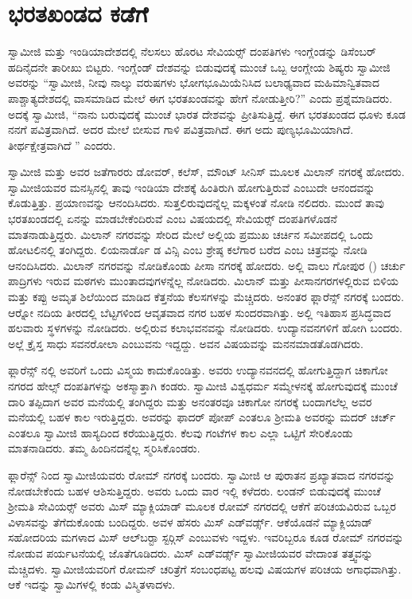 
\chapter{ಭರತಖಂಡದ ಕಡೆಗೆ }

 ಸ್ವಾಮೀಜಿ ಮತ್ತು ಇಂಡಿಯಾದೇಶದಲ್ಲಿ ನೆಲಸಲು ಹೊರಟ ಸೇವಿಯರ್ಸ್‍‍ ದಂಪತಿಗಳು ಇಂಗ್ಲೆಂಡನ್ನು ಡಿಸೆಂಬರ್ ಹದಿನೈದನೇ ತಾರೀಖು ಬಿಟ್ಟರು. ಇಂಗ್ಲೆಂಡ್ ದೇಶವನ್ನು ಬಿಡುವುದಕ್ಕೆ ಮುಂಚೆ ಒಬ್ಬ ಆಂಗ್ಲೇಯ ಶಿಷ್ಯರು ಸ್ವಾಮೀಜಿ ಅವರನ್ನು “ಸ್ವಾಮೀಜಿ, ನೀವು ನಾಲ್ಕು ವರುಷಗಳು ಭೋಗಭೂಮಿಯೆನಿಸಿದ ಬಲಾಢ್ಯವಾದ ಮಹಿಮಾನ್ವಿತವಾದ ಪಾಶ್ಚಾತ್ಯದೇಶದಲ್ಲಿ ವಾಸಮಾಡಿದ ಮೇಲೆ ಈಗ ಭರತಖಂಡವನ್ನು ಹೇಗೆ ನೋಡುತ್ತೀರಿ?” ಎಂದು ಪ್ರಶ್ನೆಮಾಡಿದರು. ಅದಕ್ಕೆ ಸ್ವಾಮೀಜಿ, “ನಾನು ಬರುವುದಕ್ಕೆ ಮುಂಚೆ ಭಾರತ ದೇಶವನ್ನು ಪ್ರೀತಿಸುತ್ತಿದ್ದೆ. ಈಗ ಭರತಖಂಡದ ಧೂಳು ಕೂಡ ನನಗೆ ಪವಿತ್ರವಾಗಿದೆ. ಅದರ ಮೇಲೆ ಬೀಸುವ ಗಾಳಿ ಪವಿತ್ರವಾಗಿದೆ. ಈಗ ಅದು ಪುಣ್ಯಭೂಮಿಯಾಗಿದೆ. ತೀರ್ಥಕ್ಷೇತ್ರವಾಗಿದೆ ” ಎಂದರು. 

 ಸ್ವಾಮೀಜಿ ಮತ್ತು ಅವರ ಜತೆಗಾರರು ಡೋವರ್, ಕಲೆಸ್, ಮೌಂಟ್ ಸೀನಿಸ್ ಮೂಲಕ ಮಿಲಾನ್ ನಗರಕ್ಕೆ ಹೋದರು. ಸ್ವಾಮೀಜಿಯವರ ಮನಸ್ಸಿನಲ್ಲಿ ತಾವು ಇಂಡಿಯಾ ದೇಶಕ್ಕೆ ಹಿಂತಿರುಗಿ ಹೋಗುತ್ತಿರುವೆ ಎಂಬುದೇ ಆನಂದವನ್ನು ಕೊಡುತ್ತಿತ್ತು. ಪ್ರಯಾಣವನ್ನು ಆನಂದಿಸಿದರು. ಸುತ್ತಲಿರುವುದನ್ನೆಲ್ಲ ಮಕ್ಕಳಂತೆ ನೋಡಿ ನಲಿದರು. ಮುಂದೆ ತಾವು ಭರತಖಂಡದಲ್ಲಿ ಏನನ್ನು ಮಾಡಬೇಕೆಂದಿರುವೆ ಎಂಬ ವಿಷಯದಲ್ಲಿ ಸೇವಿಯರ್ಸ್‍‍ ದಂಪತಿಗಳೊಡನೆ ಮಾತನಾಡುತ್ತಿದ್ದರು. ಮಿಲಾನ್ ನಗರವನ್ನು ಸೇರಿದ ಮೇಲೆ ಅಲ್ಲಿಯ ಪ್ರಮುಖ ಚರ್ಚಿನ ಸಮೀಪದಲ್ಲಿ ಒಂದು ಹೋಟಲಿನಲ್ಲಿ ತಂಗಿದ್ದರು. ಲಿಯನಾರ್ಡೊ ಡ ವಿನ್ಸಿ ಎಂಬ ಶ್ರೇಷ್ಠ ಕಲೆಗಾರ ಬರೆದ  ಎಂಬ ಚಿತ್ರವನ್ನು ನೋಡಿ ಆನಂದಿಸಿದರು. ಮಿಲಾನ್ ನಗರವನ್ನು ನೋಡಿಕೊಂಡು ಪೀಸಾ ನಗರಕ್ಕೆ ಹೋದರು. ಅಲ್ಲಿ ವಾಲು ಗೋಪುರ () ಚರ್ಚು ಪಾದ್ರಿಗಳು ಇರುವ ಮಠಗಳು ಮುಂತಾದವುಗಳನ್ನೆಲ್ಲ ನೋಡಿದರು. ಮಿಲಾನ್ ಮತ್ತು ಪೀಸಾನಗರಗಳಲ್ಲಿರುವ ಬಿಳಿಯ ಮತ್ತು ಕಪ್ಪು ಅಮೃತ ಶಿಲೆಯಿಂದ ಮಾಡಿದ ಕೆತ್ತನೆಯ ಕೆಲಸಗಳನ್ನು ಮೆಚ್ಚಿದರು. ಅನಂತರ ಫ್ಲಾರೆನ್ಸ್ ನಗರಕ್ಕೆ ಬಂದರು. ಆರ‍್ನೋ ನದಿಯ ತೀರದಲ್ಲಿ ಬೆಟ್ಟಗಳಿಂದ ಆವೃತವಾದ ನಗರ ಬಹಳ ಸುಂದರವಾಗಿತ್ತು. ಅಲ್ಲಿ ಇತಿಹಾಸ ಪ್ರಸಿದ್ಧವಾದ ಹಲವಾರು ಸ್ಥಳಗಳನ್ನು ನೋಡಿದರು. ಅಲ್ಲಿರುವ ಕಲಾಭವನವನ್ನು ನೋಡಿದರು. ಉದ್ಯಾನವನಗಳಿಗೆ ಹೋಗಿ ಬಂದರು. ಅಲ್ಲೆ ಕ್ರೈಸ್ತ ಸಾಧು ಸವನರೋಲಾ ಎಂಬುವನು ಇದ್ದದ್ದು. ಅವನ ವಿಷಯವನ್ನು ಮನನಮಾಡತೊಡಗಿದರು. 

 ಫ್ಲಾರೆನ್ಸ್ ನಲ್ಲಿ ಅವರಿಗೆ ಒಂದು ವಿಸ್ಮಯ ಕಾದುಕೊಂಡಿತ್ತು. ಅವರು ಉದ್ಯಾನವನದಲ್ಲಿ ಹೋಗುತ್ತಿದ್ದಾಗ ಚಿಕಾಗೋ ನಗರದ ಹೇಲ್ಸ್ ದಂಪತಿಗಳನ್ನು ಅಕಸ್ಮಾತ್ತಾಗಿ ಕಂಡರು. ಸ್ವಾಮೀಜಿ ವಿಶ್ವಧರ್ಮ ಸಮ್ಮೇಳನಕ್ಕೆ ಹೋಗುವುದಕ್ಕೆ ಮುಂಚೆ ದಾರಿ ತಪ್ಪಿದಾಗ ಅವರ ಮನೆಯಲ್ಲಿ ತಂಗಿದ್ದರು ಮತ್ತು ಅನಂತರವೂ ಚಿಕಾಗೋ ನಗರಕ್ಕೆ ಬಂದಾಗಲೆಲ್ಲ ಅವರ ಮನೆಯಲ್ಲಿ ಬಹಳ ಕಾಲ ಇರುತ್ತಿದ್ದರು. ಅವರನ್ನು ಫಾದರ್ ಪೋಪ್ ಎಂತಲೂ ಶ‍್ರೀಮತಿ ಅವರನ್ನು ಮದರ್ ಚರ್ಚ್ ಎಂತಲೂ ಸ್ವಾಮೀಜಿ ಹಾಸ್ಯದಿಂದ ಕರೆಯುತ್ತಿದ್ದರು. ಕೆಲವು ಗಂಟೆಗಳ ಕಾಲ ಎಲ್ಲಾ ಒಟ್ಟಿಗೆ ಸೇರಿಕೊಂಡು ಮಾತನಾಡಿದರು. ತಮ್ಮ ಹಿಂದಿನದನ್ನೆಲ್ಲ ಸ್ಮರಿಸಿಕೊಂಡರು. 

 ಫ್ಲಾರೆನ್ಸ್ ನಿಂದ ಸ್ವಾಮೀಜಿಯವರು ರೋಮ್ ನಗರಕ್ಕೆ ಬಂದರು. ಸ್ವಾಮೀಜಿ ಆ ಪುರಾತನ ಪ್ರಖ್ಯಾತವಾದ ನಗರವನ್ನು ನೋಡಬೇಕೆಂದು ಬಹಳ ಆಶಿಸುತ್ತಿದ್ದರು. ಅವರು ಒಂದು ವಾರ ಇಲ್ಲಿ ಕಳೆದರು. ಲಂಡನ್ ಬಿಡುವುದಕ್ಕೆ ಮುಂಚೆ ಶ‍್ರೀಮತಿ ಸೇವಿಯರ್ಸ್‍‍ ಅವರು ಮಿಸ್ ಮ್ಯಾಕ್ಲಿಯಾಡ್ ಮೂಲಕ ರೋಮ್ ನಗರದಲ್ಲಿ ಆಕೆಗೆ ಪರಿಚಯವಿರುವ ಒಬ್ಬರ ವಿಳಾಸವನ್ನು ತೆಗೆದುಕೊಂಡು ಬಂದಿದ್ದರು. ಅವಳ ಹೆಸರು ಮಿಸ್ ಎಡ್‍ವರ್ಡ್ಸ್. ಆಕೆಯೊಡನೆ ಮ್ಯಾಕ್ಲಿಯಾಡ್ ಸಹೋದರಿಯ ಮಗಳಾದ ಮಿಸ್ ಆಲ್‍ಬರ‍್ಟಾ ಸ್ಟರ್‍ಗಿಸ್ ಎಂಬುವಳು ಇದ್ದಳು. ಇವರಿಬ್ಬರೂ ಕೂಡ ರೋಮ್ ನಗರವನ್ನು ನೋಡುವ ಪರ್ಯಟನೆಯಲ್ಲಿ ಜೊತೆಗೂಡಿದರು. ಮಿಸ್ ಎಡ್‍ವರ್ಡ್ಸ್ ಸ್ವಾಮೀಜಿಯವರ ವೇದಾಂತ ತತ್ತ್ವವನ್ನು ಮೆಚ್ಚಿದಳು. ಸ್ವಾಮೀಜಿಯವರಿಗೆ ರೋಮನ್ ಚರಿತ್ರೆಗೆ ಸಂಬಂಧಪಟ್ಟ ಹಲವು ವಿಷಯಗಳ ಪರಿಚಯ ಅಗಾಧವಾಗಿತ್ತು. ಆಕೆ ಇದನ್ನು ಸ್ವಾಮಿಗಳಲ್ಲಿ ಕಂಡು ವಿಸ್ಮಿತಳಾದಳು. 

